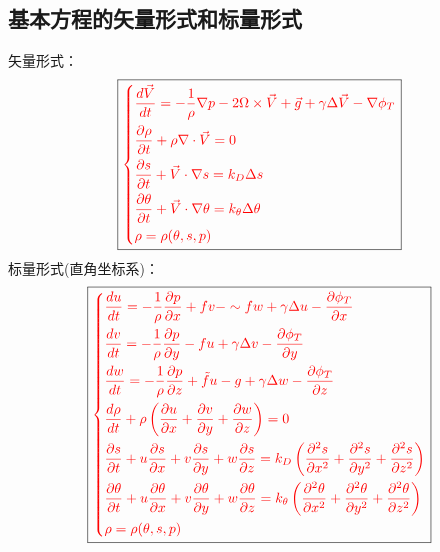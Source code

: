 \documentclass[a4paper,12pt]{article}
\begin{document}
    \subsection{基本方程的矢量形式和标量形式}
    矢量形式：
    \[
        \boxed{
        \color{red}
        \left\{
        \begin{aligned}
            &\frac{d \vec{V}}{d t}=-\frac{1}{\rho} \nabla p-2 \Omega \times \vec{V}+\vec{g}+\gamma \Delta \vec{V}-\nabla \phi_{T}\\
            &\frac{\partial \rho}{\partial t}+\rho \nabla \cdot \vec{V}=0\\
            &\frac{\partial s}{\partial t}+\vec{V} \cdot \nabla s=k_{D} \Delta s\\
            &\frac{\partial \theta}{\partial t}+\vec{V} \cdot \nabla \theta={k}_{\theta} \Delta \theta\\
            &\rho=\rho(\theta, s, p)
        \end{aligned}
        \right.
        }
    \]
    标量形式(直角坐标系)：
    \[
        \boxed{
        \color{red}
        \left\{
        \begin{aligned}
            &\frac{d u}{d t}=-\frac{1}{\rho} \frac{\partial p}{\partial x}+fv-\sim{f} w+\gamma \Delta u-\frac{\partial \phi_{T}}{\partial x}\\
            &\frac{d v}{d t}=-\frac{1}{\rho} \frac{\partial p}{\partial y}-f u+\gamma \Delta v-\frac{\partial \phi_{T}}{\partial y}\\
            &\frac{d w}{d t}=-\frac{1}{\rho} \frac{\partial p}{\partial z}+\tilde{f} u-g+\gamma \Delta w-\frac{\partial \phi_{T}}{\partial z}\\
            &\frac{d \rho}{d t}+\rho\left(\frac{\partial {u}}{\partial {x}}+\frac{\partial {v}}{\partial {y}}+\frac{\partial {w}}{\partial {z}}\right)=0\\
            &\frac{\partial s}{\partial t}+u \frac{\partial s}{\partial x}+v \frac{\partial s}{\partial y}+w \frac{\partial s}{\partial z}=k_{D}\left(\frac{\partial^{2} s}{\partial x^{2}}+\frac{\partial^{2} s}{\partial y^{2}}+\frac{\partial^{2} s}{\partial z^{2}}\right)\\
            &\frac{\partial \theta}{\partial t}+u \frac{\partial \theta}{\partial x}+v \frac{\partial \theta}{\partial y}+w \frac{\partial \theta}{\partial z}=k_{\theta}\left(\frac{\partial^{2} \theta}{\partial x^{2}}+\frac{\partial^{2} \theta}{\partial y^{2}}+\frac{\partial^{2} \theta}{\partial z^{2}}\right)\\
            &\rho=\rho(\theta, s, p)
        \end{aligned}
        \right.
        }
    \]
\end{document}
